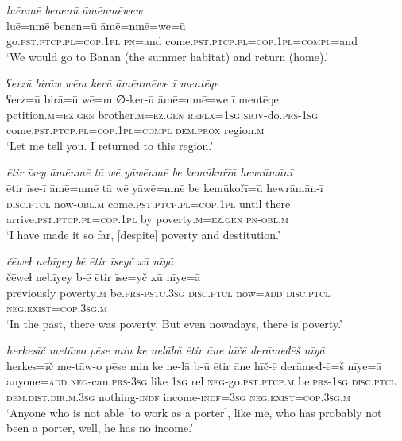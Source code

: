 \ea \label{ŽM.52}
\textit{luēnmē benenū āmēnmēwew} \\ 
\gll luē=nmē benen=ū āmē=nmē=we=ū \\ 
 go\textsc{.pst}\textsc{.ptcp}\textsc{.pl}\textsc{=cop}\textsc{.\textsc{1pl}} \textsc{pn}=and come\textsc{.pst}\textsc{.ptcp}\textsc{.pl}\textsc{=cop}\textsc{.\textsc{1pl}}\textsc{=compl}=and \\ 
\glt `We would go to Banan (the summer habitat) and return (home).'
\z 
 
\ea \label{ŽM.53}
\textit{ʕerzū birāw wēm kerū āmēnmēwe ī mentēqe} \\ 
\gll ʕerz=ū birā=ū wē=m ∅-ker-ū āmē=nmē=we ī mentēqe \\ 
 petition\textsc{.m}\textsc{=ez.gen} brother\textsc{.m}\textsc{=ez.gen} \textsc{reflx}\textsc{=\textsc{1sg}} \textsc{sbjv-}do\textsc{.prs}\textsc{-\textsc{1sg}} come\textsc{.pst}\textsc{.ptcp}\textsc{.pl}\textsc{=cop}\textsc{.\textsc{1pl}}\textsc{=compl} \textsc{dem.prox} region\textsc{.m} \\ 
\glt `Let me tell you. I returned to this region.'
\z 
 
\ea \label{ŽM.54}
\textit{ētir īsey āmēnmē tā wē yāwēnmē be kemūkuřīū hewrāmānī} \\ 
\gll ētir īse-ī āmē=nmē tā wē yāwē=nmē be kemūkořī=ū hewrāmān-ī \\ 
 \textsc{disc}.\textsc{ptcl} now\textsc{-obl}\textsc{.m} come\textsc{.pst}\textsc{.ptcp}\textsc{.pl}\textsc{=cop}\textsc{.\textsc{1pl}} until there arrive\textsc{.pst}\textsc{.ptcp}\textsc{.pl}\textsc{=cop}\textsc{.\textsc{1pl}} by poverty\textsc{.m}\textsc{=ez.gen} \textsc{pn}\textsc{-obl}\textsc{.m} \\ 
\glt `I have made it so far, [despite] poverty and destitution.'
\z 
 
\ea \label{ŽM.56}
\textit{čēweɫ nebīyey bē ētir īseyč xū nīyā} \\ 
\gll čēweɫ nebīyey b-ē ētir īse=yč xū nīye=ā \\ 
 previously poverty\textsc{.m} be\textsc{.prs}\textsc{-pstc}\textsc{.3sg} \textsc{disc.ptcl} now\textsc{=add} \textsc{disc.ptcl} \textsc{\textsc{neg.}exist}\textsc{=cop}\textsc{.3sg}\textsc{.m} \\ 
\glt `In the past, there was poverty. But even nowadays, there is poverty.'
\z 
 
\ea \label{ŽM.62}
\textit{herkesīč metāwo pēse min ke nelābū ētir āne hīčē derāmeđēš nīyā} \\ 
\gll herkes=īč me-tāw-o pēse min ke ne-lā b-ū ētir āne hīč-ē derāmeđ-ē=š nīye=ā \\ 
 anyone\textsc{=add} \textsc{neg-}can\textsc{.prs}\textsc{-3sg} like \textsc{1sg} rel \textsc{neg-}go\textsc{.pst}\textsc{.ptcp}\textsc{.m} be\textsc{.prs}\textsc{-\textsc{1sg}} \textsc{disc.ptcl} \textsc{dem.dist}\textsc{.dir}\textsc{.m}\textsc{.3sg} nothing\textsc{-indf} income\textsc{-indf}\textsc{=3sg} \textsc{\textsc{neg.}exist}\textsc{=cop}\textsc{.3sg}\textsc{.m} \\ 
\glt `Anyone who is not able [to work as a porter], like me, who has probably not been a porter, well, he has no income.'
\z 
 
